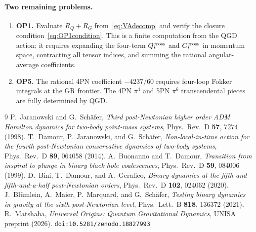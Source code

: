 \documentclass[11pt,a4paper]{article}
\theoremstyle{plain}
\theoremstyle{definition}
\theoremstyle{remark}
\begin{document}
\paragraph{Two remaining problems.}
\begin{enumerate}[nosep]
  \item \textbf{OP1.} Evaluate $R_Q+R_G$ from~\eqref{eq:VAdecomp}
    and verify the closure condition~\eqref{eq:OP1condition}.
    This is a finite computation from the QGD action; it requires
    expanding the four-term $Q_t^{\rm cross}$ and $G_t^{\rm cross}$
    in momentum space, contracting all tensor indices, and summing
    the rational angular-average coefficients.
  \item \textbf{OP5.} The rational 4PN coefficient $-4237/60$ requires
    four-loop Fokker integrals at the GR frontier.  The 4PN $\pi^4$
    and 5PN $\pi^6$ transcendental pieces are fully determined by QGD.
\end{enumerate}

\begin{thebibliography}{9}
  P.~Jaranowski and G.~Sch\"{a}fer,
  \textit{Third post-Newtonian higher order ADM Hamilton dynamics
  for two-body point-mass systems},
  Phys.\ Rev.\ D \textbf{57}, 7274 (1998).
  T.~Damour, P.~Jaranowski, and G.~Sch\"{a}fer,
  \textit{Non-local-in-time action for the fourth post-Newtonian
  conservative dynamics of two-body systems},
  Phys.\ Rev.\ D \textbf{89}, 064058 (2014).
  A.~Buonanno and T.~Damour,
  \textit{Transition from inspiral to plunge in binary black hole
  coalescences},
  Phys.\ Rev.\ D \textbf{59}, 084006 (1999).
  D.~Bini, T.~Damour, and A.~Geralico,
  \textit{Binary dynamics at the fifth and fifth-and-a-half
  post-Newtonian orders},
  Phys.\ Rev.\ D \textbf{102}, 024062 (2020).
  J.~Bl\"{u}mlein, A.~Maier, P.~Marquard, and G.~Sch\"{a}fer,
  \textit{Testing binary dynamics in gravity at the sixth
  post-Newtonian level},
  Phys.\ Lett.\ B \textbf{818}, 136372 (2021).
  R.~Matshaba,
  \textit{Universal Origins: Quantum Gravitational Dynamics},
  UNISA preprint (2026).
  \texttt{doi:10.5281/zenodo.18827993}
\end{thebibliography}
\end{document}
